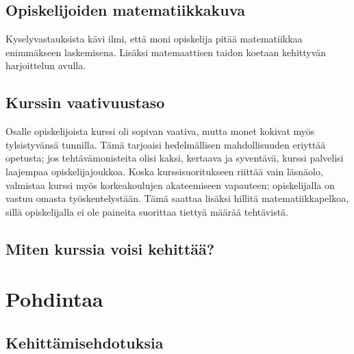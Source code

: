 \documentclass[a4paper,12pt,leqno,titlepage]{article}
\begin{document}
\subsection{Opiskelijoiden matematiikkakuva}
Kyselyvastauksista kävi ilmi, että moni opiskelija pitää matematiikkaa enimmäkseen laskemisena.
Lisäksi matemaattisen taidon koetaan kehittyvän harjoittelun avulla.


\subsection{Kurssin vaativuustaso}
Osalle opiskelijoista kurssi oli sopivan vaativa, mutta monet kokivat myös tylsistyvänsä tunnilla.
Tämä tarjoaisi hedelmällisen mahdollisuuden eriyttää opetusta; jos tehtävämonisteita olisi kaksi, kertaava ja syventävä, kurssi palvelisi laajempaa opiskelijajoukkoa.
Koska kurssisuoritukseen riittää vain läsnäolo, valmistaa kurssi myös korkeakoulujen akateemiseen vapauteen; opiskelijalla on vastuu omasta työskentelystään.
Tämä saattaa lisäksi hillitä matematiikkapelkoa, sillä opiskelijalla ei ole paineita suorittaa tiettyä määrää tehtävistä.

\subsection{Miten kurssia voisi kehittää?}


\pagebreak
\section{Pohdintaa}

\subsection{Kehittämisehdotuksia}

\pagebreak

\printbibliography


\end{document}
